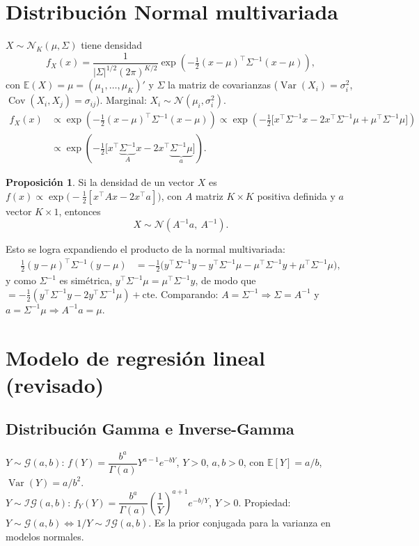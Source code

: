 \documentclass[11pt]{article}
\newcommand{\N}{\mathcal{N}}
\newcommand{\IG}{\mathcal{IG}}
\newcommand{\Ga}{\mathcal{G}}
\newcommand{\E}{\mathbb{E}}
\newcommand{\Var}{\operatorname{Var}}
\newcommand{\Cov}{\operatorname{Cov}}
\theoremstyle{definition}
\newtheorem{prop}{Proposición}
\begin{document}
\section{Distribución Normal multivariada}
$X\sim\N_K(\mu,\Sigma)$ tiene densidad
\[
f_X(x)=\frac{1}{|\Sigma|^{1/2}(2\pi)^{K/2}}\exp\!\left(-\tfrac12(x-\mu)^{\top}\Sigma^{-1}(x-\mu)\right),
\]
con $\E(X)=\mu=(\mu_1,\dots,\mu_K)'$ y $\Sigma$ la matriz de covarianzas ($\Var(X_i)=\sigma_i^2$, $\Cov(X_i,X_j)=\sigma_{ij}$). Marginal: $X_i\sim\N(\mu_i,\sigma_i^2)$.
\begin{align*}
f_X(x)&\propto\exp\!\left(-\tfrac12(x-\mu)^{\top}\Sigma^{-1}(x-\mu)\right)
\propto\exp\!\left(-\tfrac12\big[x^{\top}\Sigma^{-1}x-2x^{\top}\Sigma^{-1}\mu+\mu^{\top}\Sigma^{-1}\mu\big]\right)\\
&\propto\exp\!\left(-\tfrac12\big[x^{\top}\underbrace{\Sigma^{-1}}_{A}x-2x^{\top}\underbrace{\Sigma^{-1}\mu}_{a}\big]\right).
\end{align*}

\begin{prop}
Si la densidad de un vector $X$ es $f(x)\propto\exp\!\big(-\tfrac12[x^{\top}Ax-2x^{\top}a]\big)$, con $A$ matriz $K\times K$ positiva definida y $a$ vector $K\times1$, entonces
\[
X\sim\N(A^{-1}a,\ A^{-1}).
\]
\end{prop}
Esto se logra expandiendo el producto de la normal multivariada:
\begin{align*}
\tfrac12(y-\mu)^{\top}\Sigma^{-1}(y-\mu)&=-\tfrac12\big(y^{\top}\Sigma^{-1}y-y^{\top}\Sigma^{-1}\mu-\mu^{\top}\Sigma^{-1}y+\mu^{\top}\Sigma^{-1}\mu\big),
\end{align*}
y como $\Sigma^{-1}$ es simétrica, $y^{\top}\Sigma^{-1}\mu=\mu^{\top}\Sigma^{-1}y$, de modo que
$=-\tfrac12(y^{\top}\Sigma^{-1}y-2y^{\top}\Sigma^{-1}\mu)+\text{cte}$. Comparando: $A=\Sigma^{-1}\Rightarrow\Sigma=A^{-1}$ y $a=\Sigma^{-1}\mu\Rightarrow A^{-1}a=\mu$.

\section{Modelo de regresión lineal (revisado)}
\subsection{Distribución Gamma e Inverse-Gamma}
$Y\sim\Ga(a,b)$: $f(Y)=\dfrac{b^a}{\Gamma(a)}Y^{a-1}e^{-bY}$, $Y>0$, $a,b>0$, con $\E[Y]=a/b$, $\Var(Y)=a/b^2$.\\
$Y\sim\IG(a,b)$: $f_Y(Y)=\dfrac{b^a}{\Gamma(a)}\left(\dfrac{1}{Y}\right)^{a+1}e^{-b/Y}$, $Y>0$. Propiedad: $Y\sim\Ga(a,b)\iff 1/Y\sim\IG(a,b)$. Es la prior conjugada para la varianza en modelos normales.
\end{document}

